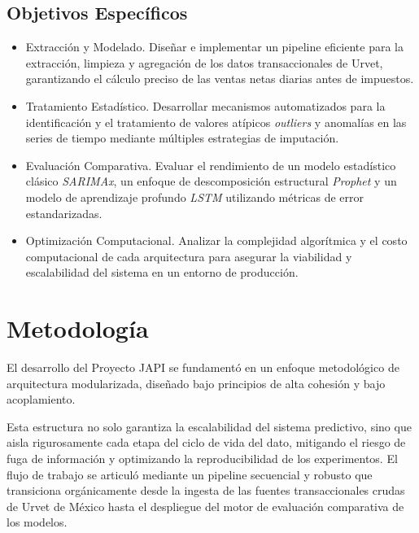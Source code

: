\documentclass[11pt,a4paper]{report}
\begin{document}
\subsection{Objetivos Específicos}
\begin{itemize}
    \item Extracción y Modelado.
    Diseñar e implementar un pipeline eficiente para la extracción, 
    limpieza y agregación de los datos transaccionales de Urvet, garantizando el cálculo preciso de las ventas netas diarias antes de impuestos.

    \item Tratamiento Estadístico.
    Desarrollar mecanismos automatizados para la identificación y el tratamiento de valores atípicos \textit{outliers}
    y anomalías en las series de tiempo mediante múltiples estrategias de imputación.

    \item Evaluación Comparativa.
    Evaluar el rendimiento de un modelo estadístico clásico \textit{SARIMAx}, un enfoque de descomposición estructural \textit{Prophet}
    y un modelo de aprendizaje profundo \textit{LSTM} utilizando métricas de error estandarizadas.

    \item Optimización Computacional.
    Analizar la complejidad algorítmica y el costo computacional de cada arquitectura
    para asegurar la viabilidad y escalabilidad del sistema en un entorno de producción.

\end{itemize}

\section{Metodología}
El desarrollo del Proyecto JAPI se fundamentó en un enfoque metodológico de arquitectura modularizada,
diseñado bajo principios de alta cohesión y bajo acoplamiento.

Esta estructura no solo garantiza la escalabilidad del sistema predictivo, sino que aisla rigurosamente
cada etapa del ciclo de vida del dato, mitigando el riesgo de fuga de información y optimizando
la reproducibilidad de los experimentos. El flujo de trabajo se articuló mediante un pipeline secuencial
y robusto que transiciona orgánicamente desde la ingesta de las fuentes transaccionales crudas de Urvet de México
hasta el despliegue del motor de evaluación comparativa de los modelos.
\end{document}
